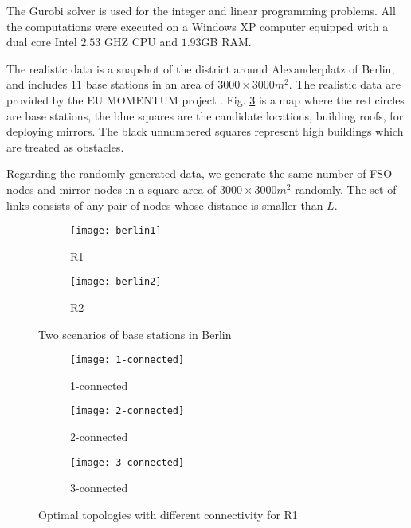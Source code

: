 \documentclass[onecolumn,11pt,draftclsnofoot]{IEEEtran}
\begin{document}
The Gurobi solver \cite{Gurobi} is used for the integer and linear programming problems. All the computations were executed on a Windows XP computer equipped with a dual core Intel $2.53$ GHZ CPU and $1.93$GB RAM.

The realistic data is a snapshot of the district around Alexanderplatz of Berlin, and includes $11$ base stations in an area of $3000 \times 3000 m^2$. The realistic data are provided by the EU MOMENTUM project \cite{MOMENTUM}. Fig. \ref{fig:scenarios} is a map where the red circles are base stations, the blue squares are the candidate locations, building roofs, for deploying mirrors. The black unnumbered squares represent high buildings which are treated as obstacles.

Regarding the randomly generated data, we generate the same number of FSO nodes and mirror nodes in a square area of $3000 \times 3000 m^2$ randomly. The set of links consists of any pair of nodes whose distance is smaller than $L$.

\begin{figure}
        \centering
        \begin{subfigure}[b]{0.25\textwidth}
                \centering
                \texttt{[image: berlin1]}
                \caption{R1}
                \label{fig:berlin1}
        \end{subfigure}
        \begin{subfigure}[b]{0.25\textwidth}
                \centering
                \texttt{[image: berlin2]}
                \caption{R2}
                \label{fig:berlin2}
        \end{subfigure}
        \caption{Two scenarios of base stations in Berlin}\label{fig:scenarios}
\end{figure}
\begin{figure*}[!hbtp]
        \centering
        \begin{subfigure}[b]{0.3\textwidth}
                \centering
                \texttt{[image: 1-connected]}
                \caption{1-connected}
                \label{fig:1-connected}
        \end{subfigure}
        \begin{subfigure}[b]{0.3\textwidth}
                \centering
                \texttt{[image: 2-connected]}
                \caption{2-connected}
                \label{fig:2-connected}
        \end{subfigure}
        \begin{subfigure}[b]{0.3\textwidth}
                \centering
                \texttt{[image: 3-connected]}
                \caption{3-connected}
                \label{fig:3-connected}
        \end{subfigure}
        \caption{Optimal topologies with different connectivity for R1}\label{fig:connectivity}
\end{figure*}
\end{document}
